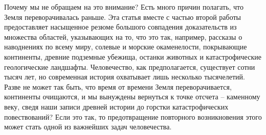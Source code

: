 \documentclass[10pt,twocolumn,letterpaper]{article}
\begin{document}
Почему мы не обращаем на это внимание? Есть много причин полагать, что Земля переворачивалась раньше. Эта статья вместе с частью второй работы предоставляет насыщенное резюме большого совпадения доказательств из множества областей, указывающих на то, что это так, например, рассказы о наводнениях по всему миру, солевые и морские окаменелости, покрывающие континенты, древние подземные убежища, останки животных и катастрофические геологические ландшафты. Человечество, как предполагается, существует сотни тысяч лет, но современная история охватывает лишь несколько тысячелетий. Разве не может так быть, что время от времени Земля переворачивается, континенты очищаются, и мы вынуждены вернуться к точке отсчета – каменному веку, сведя наши записи древней истории до горстки катастрофических повествований? Если это так, то предотвращение повторного возникновения этого может стать одной из важнейших задач человечества.
\end{document}
